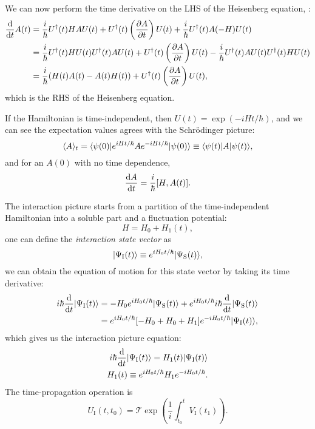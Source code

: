 \documentclass{article}
\begin{document}
We can now perform the time derivative on the LHS of the Heisenberg equation, :
\begin{align}
\diff{}{t} A(t) &=\frac{i}{\hbar}U^{\dagger}(t)HAU(t)+U^{\dagger}(t)\left( \diffp{A}{t} \right)U(t)+\frac{i}{\hbar}U^{\dagger}(t)A(-H)U(t)\\
&=\frac{i}{\hbar}U^{\dagger}(t)HU(t)U^{\dagger}(t)AU(t)+U^{\dagger}(t)\left( \diffp{A}{t} \right)U(t)-\frac{i}{\hbar}U^{\dagger}(t)AU(t)U^{\dagger}(t)HU(t)\\
&=\frac{i}{\hbar}(H(t)A(t)-A(t)H(t))+U^{\dagger}(t)\left( \diffp{A}{t} \right)U(t),
\end{align}
which is the RHS of the Heisenberg equation.

If the Hamiltonian is time-independent, then $U(t)=\exp(-iHt/\hbar)$, and we can see the expectation values agrees with the Schr{\" o}dinger picture:
\begin{equation}
\langle A\rangle_t=\langle\psi(0)|e^{iHt/\hbar}Ae^{-iHt/\hbar}|\psi(0)\rangle\equiv\langle\psi(t)|A|\psi(t)\rangle,
\end{equation}
and for an $A(0)$ with no time dependence,
\begin{equation}
    \diff{A}{t}=\frac{i}{\hbar}[H,A(t)].
\end{equation}

The interaction picture starts from a partition of the time-independent Hamiltonian into a soluble part and a fluctuation potential:
\begin{equation}
    H=H_0+H_1(t),
\end{equation}
one can define the \textit{interaction state vector} as
\begin{equation}
    |\Psi_{\mathrm{I}}(t)\rangle\equiv e^{iH_0t/\hbar}|\Psi_{\mathrm{S}}(t)\rangle,
\end{equation}
we can obtain the equation of motion for this state vector by taking its time derivative:
\begin{align}
    i\hbar\diff{}{t}|\Psi_{\mathrm{I}}(t)\ket&=-H_0e^{iH_0t/\hbar}|\Psi_{\mathrm{S}}(t)\ket+e^{iH_0t/\hbar}i\hbar\diff{}{t}|\Psi_{\mathrm{S}}(t)\ket\\
    &=e^{iH_0t/\hbar}[-H_0+H_0+H_1]e^{-iH_0t/\hbar}|\Psi_{\mathrm{I}}(t)\ket,
\end{align}
which gives us the interaction picture equation:
\begin{align}
    i\hbar\diff{}{t}|\Psi_{\mathrm{I}}(t)\ket=H_1(t)|\Psi_{\mathrm{I}}(t)\ket \\
    H_1(t)\equiv e^{iH_0t/\hbar}H_1e^{-iH_0t/\hbar}.
\end{align}
The time-propagation operation is 
\begin{equation}
    U_{\mathrm{I}}(t,t_0)=\mathcal{T}\exp\left(\frac{1}{i}\int_{t_0}^tV_{\mathrm{I}}(t_1)\right).
\end{equation}
\end{document}

